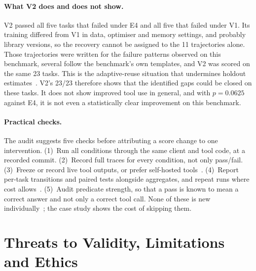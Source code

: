 \documentclass[runningheads]{llncs}
\begin{document}
\paragraph{What V2 does and does not show.}
V2 passed all five tasks that failed under E4 and all five that failed under V1. Its training differed from V1 in data, optimiser and memory settings, and probably library versions, so the recovery cannot be assigned to the 11 trajectories alone. Those trajectories were written for the failure patterns observed on this benchmark, several follow the benchmark's own templates, and V2 was scored on the same 23 tasks. This is the adaptive-reuse situation that undermines holdout estimates~\cite{dwork2015reusable}. V2's 23/23 therefore shows that the identified gaps could be closed on these tasks. It does not show improved tool use in general, and with $p=0.0625$ against E4, it is not even a statistically clear improvement on this benchmark.

\paragraph{Practical checks.}
The audit suggests five checks before attributing a score change to one intervention. (1)~Run all conditions through the same client and tool code, at a recorded commit. (2)~Record full traces for every condition, not only pass/fail. (3)~Freeze or record live tool outputs, or prefer self-hosted tools~\cite{zhou2024webarena}. (4)~Report per-task transitions and paired tests alongside aggregates, and repeat runs where cost allows~\cite{yao2024taubench,bouthillier2021variance}. (5)~Audit predicate strength, so that a pass is known to mean a correct answer and not only a correct tool call. None of these is new individually~\cite{biderman2024lessons,kapoor2025agents}; the case study shows the cost of skipping them.

\section{Threats to Validity, Limitations and Ethics}
\label{sec:threats}
\end{document}
